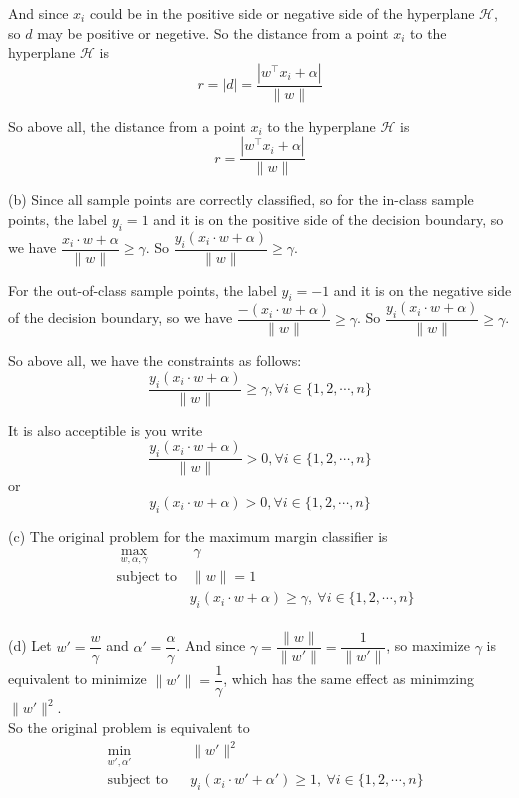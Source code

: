 And since $x_i$ could be in the positive side or negative side of the hyperplane $\mathcal{H}$, so $d$ may be positive or negetive.
So the distance from a point $x_i$ to the hyperplane $\mathcal{H}$ is
$$r = |d| = \dfrac{|w^{\top}x_i + \alpha|}{\|w\|}$$

So above all, the distance from a point $x_i$ to the hyperplane $\mathcal{H}$ is
$$r = \dfrac{|w^{\top}x_i + \alpha|}{\|w\|}$$

(b) Since all sample points are correctly classified, so for the in-class sample points, the label $y_i=1$ and it is on the positive side of the decision boundary, so we have $\dfrac{{x_i\cdot w+\alpha}}{\|w\|}\geq \gamma$.
So $\dfrac{y_i(x_i\cdot w+\alpha)}{\|w\|}\geq \gamma$.

For the out-of-class sample points, the label $y_i=-1$ and it is on the negative side of the decision boundary, so we have $\dfrac{-(x_i\cdot w+\alpha)}{\|w\|}\geq \gamma$.
So $\dfrac{y_i(x_i\cdot w+\alpha)}{\|w\|}\geq \gamma$.

So above all, we have the constraints as follows:
$$\dfrac{y_i(x_i\cdot w+\alpha)}{\|w\|}\geq \gamma, \forall i\in\{1,2,\cdots,n\}$$

It is also acceptible is you write
$$\dfrac{y_i(x_i\cdot w+\alpha)}{\|w\|}> 0, \forall i\in\{1,2,\cdots,n\}$$
or
$$y_i(x_i\cdot w+\alpha)> 0, \forall i\in\{1,2,\cdots,n\}$$

(c) The original problem for the maximum margin classifier is
\begin{equation}
\begin{aligned}
&\max_{w,\alpha, \gamma}\qquad\quad \gamma \\
&\text{subject to}\quad \|w\|=1 \\
&\qquad\qquad\quad\ y_i(x_i\cdot w+\alpha)\geq \gamma,\ \forall i\in\{1,2,\cdots,n\} \\
\end{aligned}
\end{equation}

(d) Let $w'=\dfrac{w}{\gamma}$ and $\alpha'=\dfrac{\alpha}{\gamma}$. And since $\gamma=\dfrac{\|w\|}{\|w'\|}=\dfrac{1}{\|w'\|}$, so maximize $\gamma$ is equivalent to minimize $\|w'\|=\dfrac{1}{\gamma}$, which has the same effect as minimzing $\|w'\|^2$. \\
So the original problem is equivalent to
\begin{equation}
\begin{aligned}
& \min_{w',\alpha'}
& & \|w'\|^2 \\
& \text{subject to}
& & y_i(x_i\cdot w'+\alpha')\geq 1,\ \forall i\in\{1,2,\cdots,n\} \\
\end{aligned}
\end{equation}

\newpage